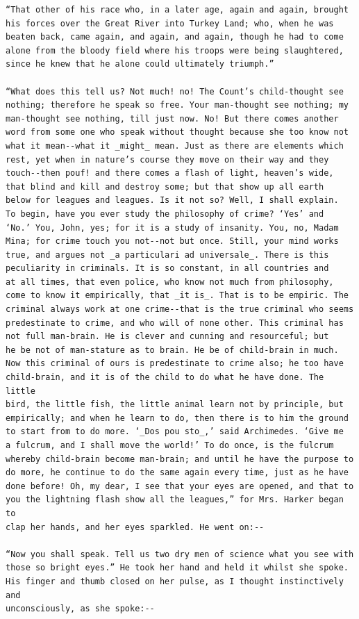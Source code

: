 \documentclass{article}
\begin{document}
\begin{verbatim}
“That other of his race who, in a later age, again and again, brought
his forces over the Great River into Turkey Land; who, when he was
beaten back, came again, and again, and again, though he had to come
alone from the bloody field where his troops were being slaughtered,
since he knew that he alone could ultimately triumph.”

“What does this tell us? Not much! no! The Count’s child-thought see
nothing; therefore he speak so free. Your man-thought see nothing; my
man-thought see nothing, till just now. No! But there comes another
word from some one who speak without thought because she too know not
what it mean--what it _might_ mean. Just as there are elements which
rest, yet when in nature’s course they move on their way and they
touch--then pouf! and there comes a flash of light, heaven’s wide,
that blind and kill and destroy some; but that show up all earth
below for leagues and leagues. Is it not so? Well, I shall explain.
To begin, have you ever study the philosophy of crime? ‘Yes’ and
‘No.’ You, John, yes; for it is a study of insanity. You, no, Madam
Mina; for crime touch you not--not but once. Still, your mind works
true, and argues not _a particulari ad universale_. There is this
peculiarity in criminals. It is so constant, in all countries and
at all times, that even police, who know not much from philosophy,
come to know it empirically, that _it is_. That is to be empiric. The
criminal always work at one crime--that is the true criminal who seems
predestinate to crime, and who will of none other. This criminal has
not full man-brain. He is clever and cunning and resourceful; but
he be not of man-stature as to brain. He be of child-brain in much.
Now this criminal of ours is predestinate to crime also; he too have
child-brain, and it is of the child to do what he have done. The little
bird, the little fish, the little animal learn not by principle, but
empirically; and when he learn to do, then there is to him the ground
to start from to do more. ‘_Dos pou sto_,’ said Archimedes. ‘Give me
a fulcrum, and I shall move the world!’ To do once, is the fulcrum
whereby child-brain become man-brain; and until he have the purpose to
do more, he continue to do the same again every time, just as he have
done before! Oh, my dear, I see that your eyes are opened, and that to
you the lightning flash show all the leagues,” for Mrs. Harker began to
clap her hands, and her eyes sparkled. He went on:--

“Now you shall speak. Tell us two dry men of science what you see with
those so bright eyes.” He took her hand and held it whilst she spoke.
His finger and thumb closed on her pulse, as I thought instinctively and
unconsciously, as she spoke:--


\end{verbatim}
\end{document}
